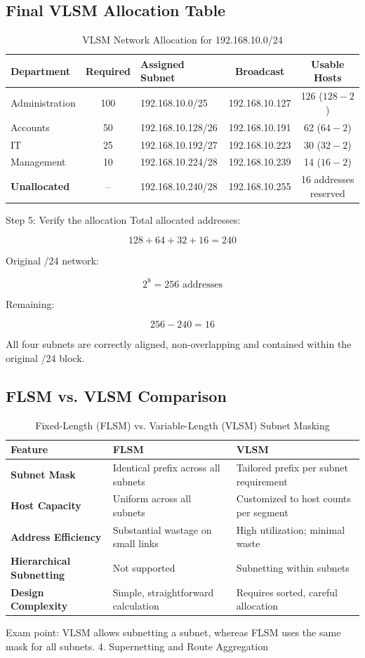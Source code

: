 \subsection{Final VLSM Allocation Table}
\begin{table}[htbp]
\centering
\caption{VLSM Network Allocation for 192.168.10.0/24}
\label{tab:vlsm_allocation_result}
\begin{tabularx}{\textwidth}{p{2.8cm} c X c c}
\toprule
\textbf{Department} & \textbf{Required} & \textbf{Assigned Subnet} & \textbf{Broadcast} & \textbf{Usable Hosts} \\
\midrule
Administration & 100 & 192.168.10.0/25   & 192.168.10.127 & 126 ($128 - 2$) \\
Accounts       & 50  & 192.168.10.128/26 & 192.168.10.191 & 62 ($64 - 2$) \\
IT             & 25  & 192.168.10.192/27 & 192.168.10.223 & 30 ($32 - 2$) \\
Management     & 10  & 192.168.10.224/28 & 192.168.10.239 & 14 ($16 - 2$) \\
\midrule
\textbf{Unallocated} & -- & 192.168.10.240/28 & 192.168.10.255 & 16 addresses reserved \\
\bottomrule
\end{tabularx}
\end{table}
Step 5: Verify the allocation
Total allocated addresses:

\[
128+64+32+16=240
\]

Original /24 network:

\[
2^8=256\text{ addresses}
\]

Remaining:

\[
256-240=\boxed{16}
\]

All four subnets are correctly aligned, non-overlapping and contained within the original /24 block.
\subsection{FLSM vs. VLSM Comparison}
\begin{table}[htbp]
\centering
\caption{Fixed-Length (FLSM) vs. Variable-Length (VLSM) Subnet Masking}
\label{tab:flsm_vs_vlsm}
\begin{tabularx}{\textwidth}{p{3.8cm} X X}
\toprule
\textbf{Feature} & \textbf{FLSM} & \textbf{VLSM} \\
\midrule
\textbf{Subnet Mask} & Identical prefix across all subnets & Tailored prefix per subnet requirement \\
\textbf{Host Capacity} & Uniform across all subnets & Customized to host counts per segment \\
\textbf{Address Efficiency} & Substantial wastage on small links & High utilization; minimal waste \\
\textbf{Hierarchical Subnetting} & Not supported & Subnetting within subnets \\
\textbf{Design Complexity} & Simple, straightforward calculation & Requires sorted, careful allocation \\
\bottomrule
\end{tabularx}
\end{table}
Exam point: VLSM allows subnetting a subnet, whereas FLSM uses the same mask for all subnets.
4. Supernetting and Route Aggregation
